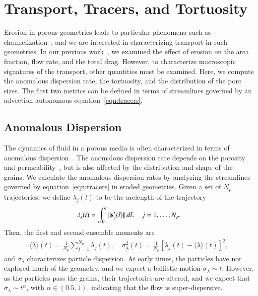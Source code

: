 \documentclass[preprint,10pt]{elsarticle}
\begin{document}
\section{Transport, Tracers, and Tortuosity}
\label{sec:transport}
Erosion in porous geometries leads to particular phenomena such as
channelization~\cite{berhanu2012shape}, and we are interested in
characterizing transport in such geometries.  In our previous
work~\cite{qua-moo2018}, we examined the effect of erosion on the area
fraction, flow rate, and the total drag.  However, to characterize
macroscopic signatures of the transport, other quantities must be
examined.  Here, we compute the anomalous dispersion rate, the
tortuosity, and the distribution of the pore sizes.  The first two
metrics can be defined in terms of streamlines governed by an advection
autonomous equation~\eqref{eqn:tracers}.

\subsection{Anomalous Dispersion}
\label{sec:dispersion}
The dynamics of fluid in a porous media is often characterized in terms
of anomalous dispersion~\cite{kla-rad-sok2008, den-cor-sch-ber2004}.
The anomalous dispersion rate depends on the porosity and
permeability~\cite{koc-bra1988}, but is also affected by the
distribution and shape of the grains. We calculate the anomalous
dispersion rates by analyzing the streamlines governed by
equation~\eqref{eqn:tracers} in eroded geometries. Given a set of $N_p$
trajectories, we define $\lambda_j(t)$ to be the arclength of the
trajectory
\begin{align}
  \lambda_j(t) = \int_{0}^t \|\ss'_j(\tilde{t})\|\, d\tilde{t}, 
    \quad j=1,\ldots,N_p.
\end{align}
Then, the first and second ensemble moments are
\begin{align}
  \label{eqn:moments}
  \langle \lambda \rangle (t) = 
    \frac{1}{N_p} \sum_{j=1}^{N_p} \lambda_j(t), \quad 
    \sigma_\lambda^2(t) = \frac{1}{N_p} 
    \left[\lambda_j(t) - \langle \lambda \rangle(t) \right]^2,
\end{align}
and $\sigma_\lambda$ characterizes particle dispersion.  At early times,
the particles have not explored much of the geometry, and we expect a
ballistic motion $\sigma_\lambda \sim t$.  However, as the particles
pass the grains, their trajectories are altered, and we expect that
$\sigma_\lambda \sim t^\alpha$, with $\alpha \in (0.5,1)$, indicating
that the flow is super-dispersive.
\end{document}

